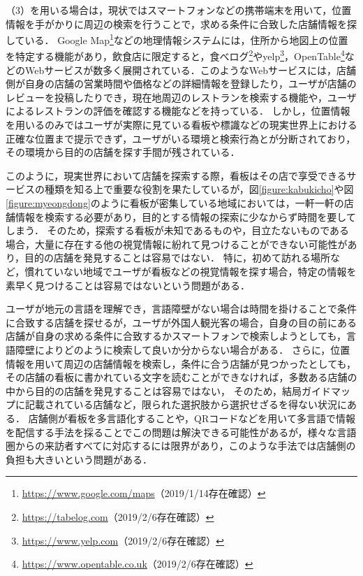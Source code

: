   （3）を用いる場合は，現状ではスマートフォンなどの携帯端末を用いて，位置情報を手がかりに周辺の検索を行うことで，求める条件に合致した店舗情報を探している．
  Google Map\footnote{\url{https://www.google.com/maps}（2019/1/14存在確認）}などの地理情報システムには，住所から地図上の位置を特定する機能があり，飲食店に限定すると，食べログ\footnote{\url{https://tabelog.com}（2019/2/6存在確認）}やyelp\footnote{\url{https://www.yelp.com}（2019/2/6存在確認）}，OpenTable\footnote{\url{https://www.opentable.co.uk}（2019/2/6存在確認）}などのWebサービスが数多く展開されている．このようなWebサービスには，店舗側が自身の店舗の営業時間や価格などの詳細情報を登録したり，ユーザが店舗のレビューを投稿したりでき，現在地周辺のレストランを検索する機能や，ユーザによるレストランの評価を確認する機能などを持っている．
  しかし，位置情報を用いるのみではユーザが実際に見ている看板や標識などの現実世界上における正確な位置まで提示できず，ユーザがいる環境と検索行為とが分断されており，その環境から目的の店舗を探す手間が残されている．
  
  このように，現実世界において店舗を探索する際，看板はその店で享受できるサービスの種類を知る上で重要な役割を果たしているが，図\ref{figure:kabukicho}や図\ref{figure:myeongdong}のように看板が密集している地域においては，一軒一軒の店舗情報を検索する必要があり，目的とする情報の探索に少なからず時間を要してしまう．
  そのため，探索する看板が未知であるものや，目立たないものである場合，大量に存在する他の視覚情報に紛れて見つけることができない可能性があり，目的の店舗を発見することは容易ではない．
  特に，初めて訪れる場所など，慣れていない地域でユーザが看板などの視覚情報を探す場合，特定の情報を素早く見つけることは容易ではないという問題がある．

  ユーザが地元の言語を理解でき，言語障壁がない場合は時間を掛けることで条件に合致する店舗を探せるが，ユーザが外国人観光客の場合，自身の目の前にある店舗が自身の求める条件に合致するかスマートフォンで検索しようとしても，言語障壁によりどのように検索して良いか分からない場合がある．
  さらに，位置情報を用いて周辺の店舗情報を検索し，条件に合う店舗が見つかったとしても，その店舗の看板に書かれている文字を読むことができなければ，多数ある店舗の中から目的の店舗を発見することは容易ではない，
  そのため，結局ガイドマップに記載されている店舗など，限られた選択肢から選択せざるを得ない状況にある．
  店舗側が看板を多言語化することや，QRコードなどを用いて多言語で情報を配信する手法を採ることでこの問題は解決できる可能性があるが，様々な言語圏からの来訪者すべてに対応するには限界があり，このような手法では店舗側の負担も大きいという問題がある．

